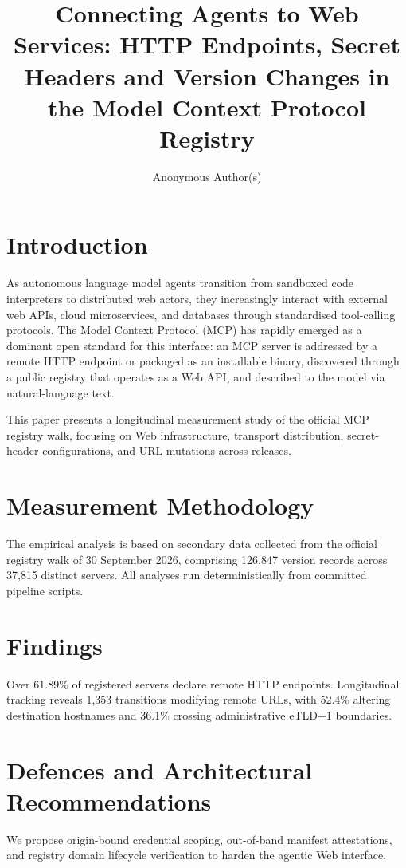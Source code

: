 \documentclass[sigconf,anonymous,review]{acmart}
\title{Connecting Agents to Web Services: HTTP Endpoints, Secret Headers and Version Changes in the Model Context Protocol Registry}
\author{Anonymous Author(s)}
\affiliation{%
  \institution{Anonymous Institution}
  \country{Anonymous Country}
}
\begin{document}
\maketitle

\section{Introduction}
As autonomous language model agents transition from sandboxed code interpreters to distributed web actors, they increasingly interact with external web APIs, cloud microservices, and databases through standardised tool-calling protocols. The Model Context Protocol (MCP) has rapidly emerged as a dominant open standard for this interface: an MCP server is addressed by a remote HTTP endpoint or packaged as an installable binary, discovered through a public registry that operates as a Web API, and described to the model via natural-language text.

This paper presents a longitudinal measurement study of the official MCP registry walk, focusing on Web infrastructure, transport distribution, secret-header configurations, and URL mutations across releases.

\section{Measurement Methodology}
The empirical analysis is based on secondary data collected from the official registry walk of 30 September 2026, comprising 126,847 version records across 37,815 distinct servers. All analyses run deterministically from committed pipeline scripts.

\section{Findings}
Over 61.89\% of registered servers declare remote HTTP endpoints. Longitudinal tracking reveals 1,353 transitions modifying remote URLs, with 52.4\% altering destination hostnames and 36.1\% crossing administrative eTLD+1 boundaries.

\section{Defences and Architectural Recommendations}
We propose origin-bound credential scoping, out-of-band manifest attestations, and registry domain lifecycle verification to harden the agentic Web interface.



\end{document}
